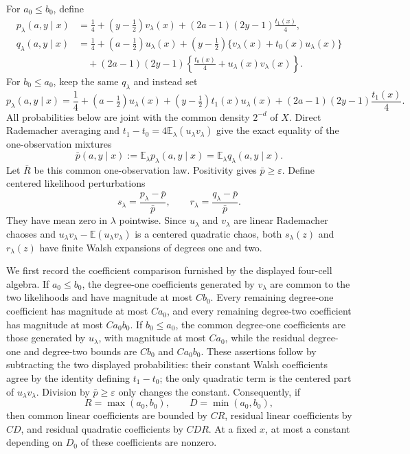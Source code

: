 For \(a_0\le b_0\), define
\[
\begin{aligned}
 p_\lambda(a,y\mid x)
 &=\frac14+(y-\tfrac12)v_\lambda(x)
 +(2a-1)(2y-1)\frac{t_1(x)}4,\\
 q_\lambda(a,y\mid x)
 &=\frac14+(a-\tfrac12)u_\lambda(x)
 +(y-\tfrac12)\{v_\lambda(x)+t_0(x)u_\lambda(x)\}\\
 &\quad +(2a-1)(2y-1)
 \left\{\frac{t_0(x)}4+u_\lambda(x)v_\lambda(x)\right\}.
\end{aligned}
\]
For \(b_0\le a_0\), keep the same \(q_\lambda\) and instead set
\[
 p_\lambda(a,y\mid x)
 =\frac14+(a-\tfrac12)u_\lambda(x)
 +(y-\tfrac12)t_1(x)u_\lambda(x)
 +(2a-1)(2y-1)\frac{t_1(x)}4.
\]
All probabilities below are joint with the common density \(2^{-d}\) of \(X\). Direct Rademacher averaging and
\(
 t_1-t_0=4\mathbb E_\lambda(u_\lambda v_\lambda)
\)
give the exact equality of the one-observation mixtures
\[
 \bar p(a,y\mid x):=\mathbb E_\lambda p_\lambda(a,y\mid x)
 =\mathbb E_\lambda q_\lambda(a,y\mid x).
\]
Let \(\bar R\) be this common one-observation law. Positivity gives \(\bar p\ge\varepsilon\). Define centered likelihood perturbations
\[
 s_\lambda=\frac{p_\lambda-\bar p}{\bar p},
 \qquad
 r_\lambda=\frac{q_\lambda-\bar p}{\bar p}.
\]
They have mean zero in \(\lambda\) pointwise. Since \(u_\lambda\) and \(v_\lambda\) are linear Rademacher chaoses and \(u_\lambda v_\lambda-\mathbb E(u_\lambda v_\lambda)\) is a centered quadratic chaos, both \(s_\lambda(z)\) and \(r_\lambda(z)\) have finite Walsh expansions of degrees one and two.

We first record the coefficient comparison furnished by the displayed four-cell algebra. If \(a_0\le b_0\), the degree-one coefficients generated by \(v_\lambda\) are common to the two likelihoods and have magnitude at most \(Cb_0\). Every remaining degree-one coefficient has magnitude at most \(Ca_0\), and every remaining degree-two coefficient has magnitude at most \(Ca_0b_0\). If \(b_0\le a_0\), the common degree-one coefficients are those generated by \(u_\lambda\), with magnitude at most \(Ca_0\), while the residual degree-one and degree-two bounds are \(Cb_0\) and \(Ca_0b_0\). These assertions follow by subtracting the two displayed probabilities: their constant Walsh coefficients agree by the identity defining \(t_1-t_0\); the only quadratic term is the centered part of \(u_\lambda v_\lambda\). Division by \(\bar p\ge\varepsilon\) only changes the constant. Consequently, if
\[
 R=\max(a_0,b_0),
 \qquad D=\min(a_0,b_0),
\]
then common linear coefficients are bounded by \(CR\), residual linear coefficients by \(CD\), and residual quadratic coefficients by \(CDR\). At a fixed \(x\), at most a constant depending on \(D_0\) of these coefficients are nonzero.

